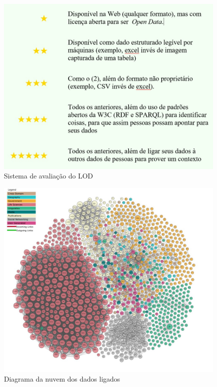 \begin{figure}
	\centering
	\includegraphics[scale=0.50]{imagens/lod_rating.jpg}
	\caption{Sistema de avaliação do LOD \citep{SemanticWebStack}}
	\label{fig:lod-rating}
\end{figure}

\begin{figure}
	\centering
	\includegraphics[scale=0.47]{imagens/lod_graph.jpg}
	\caption{Diagrama da nuvem dos dados ligados \citep{LODGraph}}
	\label{fig:lod-graph}
\end{figure}

